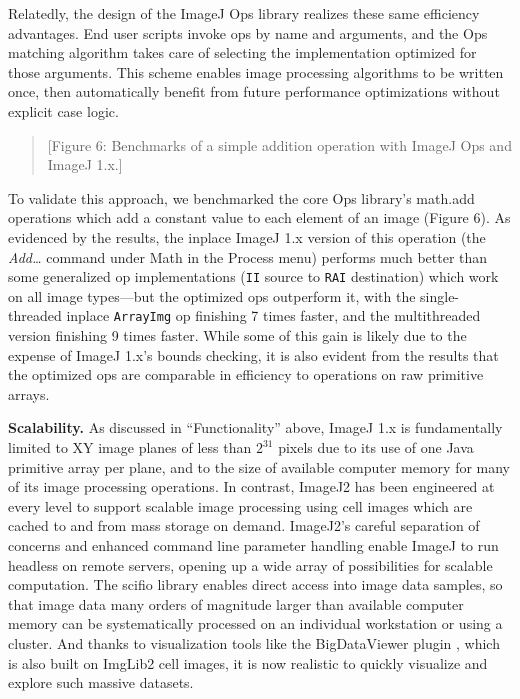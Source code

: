 \documentclass{bmcart}
\begin{document}
Relatedly, the design of the ImageJ Ops library realizes these same efficiency
advantages. End user scripts invoke ops by name and arguments, and the Ops
matching algorithm takes care of selecting the implementation optimized for
those arguments. This scheme enables image processing algorithms to be written
once, then automatically benefit from future performance optimizations without
explicit case logic.

\begin{quote}
[Figure 6: Benchmarks of a simple addition operation with ImageJ Ops and ImageJ
1.x.]
\end{quote}

To validate this approach, we benchmarked the core Ops library's math.add
operations which add a constant value to each element of an image (Figure 6).
As evidenced by the results, the inplace ImageJ 1.x version of this operation
(the \textit{Add\ldots} command under Math in the Process menu) performs much
better than some generalized op implementations (\texttt{II} source to
\texttt{RAI} destination) which work on all image types---but the optimized ops
outperform it, with the single-threaded inplace \texttt{ArrayImg} op finishing
7 times faster, and the multithreaded version finishing 9 times faster. While
some of this gain is likely due to the expense of ImageJ 1.x's bounds checking,
it is also evident from the results that the optimized ops are comparable in
efficiency to operations on raw primitive arrays.

\textbf{Scalability.} As discussed in ``Functionality'' above, ImageJ 1.x is
fundamentally limited to XY image planes of less than $2^{31}$ pixels due to
its use of one Java primitive array per plane, and to the size of available
computer memory for many of its image processing operations. In contrast,
ImageJ2 has been engineered at every level to support scalable image processing
using cell images which are cached to and from mass storage on demand.
ImageJ2's careful separation of concerns and enhanced command line parameter
handling enable ImageJ to run headless on remote servers, opening up a wide
array of possibilities for scalable computation. The \acrshort{scifio} library
enables direct access into image data samples, so that image data many orders
of magnitude larger than available computer memory can be systematically
processed on an individual workstation or using a cluster. And thanks to
visualization tools like the BigDataViewer plugin \cite{bigdataviewer}, which
is also built on ImgLib2 cell images, it is now realistic to quickly visualize
and explore such massive datasets.
\end{document}
